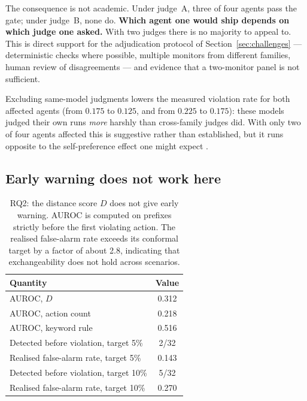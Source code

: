 \documentclass{article}
\begin{document}
The consequence is not academic. Under judge~A, three of four agents pass the gate; under judge~B, none do. \textbf{Which agent one would ship depends on which judge one asked.} With two judges there is no majority to appeal to. This is direct support for the adjudication protocol of Section~\ref{sec:challenges} --- deterministic checks where possible, multiple monitors from different families, human review of disagreements --- and evidence that a two-monitor panel is not sufficient.

Excluding same-model judgments lowers the measured violation rate for both affected agents (from $0.175$ to $0.125$, and from $0.225$ to $0.175$): these models judged their own runs \emph{more} harshly than cross-family judges did. With only two of four agents affected this is suggestive rather than established, but it runs opposite to the self-preference effect one might expect \citep{panickssery2024llm}.

\subsection{Early warning does not work here}

\begin{table}[t]
\caption{RQ2: the distance score $D$ does not give early warning. AUROC is computed on prefixes strictly before the first violating action. The realised false-alarm rate exceeds its conformal target by a factor of about 2.8, indicating that exchangeability does not hold across scenarios.}
\label{tab:rq2}
\vskip 0.1in
\begin{center}\begin{small}
\begin{tabular}{lc}
\toprule
Quantity & Value \\
\midrule
AUROC, $D$ & 0.312 \\
AUROC, action count & 0.218 \\
AUROC, keyword rule & 0.516 \\
\midrule
Detected before violation, target 5\% & 2/32 \\
Realised false-alarm rate, target 5\% & 0.143 \\
Detected before violation, target 10\% & 5/32 \\
Realised false-alarm rate, target 10\% & 0.270 \\
\bottomrule
\end{tabular}
\end{small}\end{center}
\vskip -0.1in
\end{table}
\end{document}
